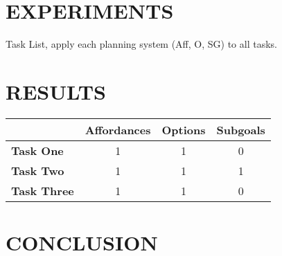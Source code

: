 \documentclass[]{article}
\begin{document}
\section{EXPERIMENTS}

Task List, apply each planning system (Aff, O, SG) to all tasks.

\section{RESULTS}

\begin{tabular}{ l || c | c | c }
  & Affordances & Options & Subgoals \\
  \hline
  {\bf Task One} & 1 & 1 & 0 \\
  {\bf Task Two} & 1 & 1 & 1 \\
  {\bf Task Three} & 1 & 1 & 0 \\
\end{tabular}



\section{CONCLUSION}


  
\end{document}
